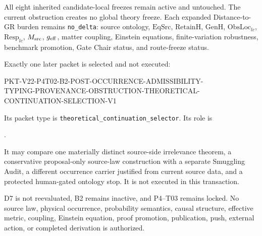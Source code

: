 \documentclass[11pt]{article}
\begin{document}
All eight inherited candidate-local freezes remain active and untouched.  The
current obstruction creates no global theory freeze.  Each expanded
Distance-to-GR burden remains \texttt{no\_delta}: source ontology,
$\mathrm{EqSrc}$, $\mathrm{RetainH}$, $\mathrm{GenH}$,
$\mathrm{ObsLoc}_{lc}$, $\mathrm{Resp}_{lc}$, $M_{\rm src}$,
$g_{\rm eff}$, matter coupling, Einstein equations, finite-variation
robustness, benchmark promotion, Gate Chair status, and route-freeze status.

Exactly one later packet is selected and not executed:
\begin{center}
\small\ttfamily
PKT-V22-P4T02-B2-POST-OCCURRENCE-ADMISSIBILITY-\\
TYPING-PROVENANCE-OBSTRUCTION-THEORETICAL-\\
CONTINUATION-SELECTION-V1
\end{center}
Its packet type is \texttt{theoretical\_continuation\_selector}.  Its role is
\begin{center}
\small{}.
\end{center}
It may compare one
materially distinct source-side irrelevance theorem, a conservative
proposal-only source-law construction with a separate Smuggling Audit, a
different occurrence carrier justified from current source data, and a
protected human-gated ontology stop.  It is not executed in this transaction.

D7 is not reevaluated, B2 remains inactive, and P4--T03 remains locked.  No
source law, physical occurrence, probability semantics, causal structure,
effective metric, coupling, Einstein equation, proof promotion, publication,
push, external action, or completed derivation is authorized.
\end{document}
